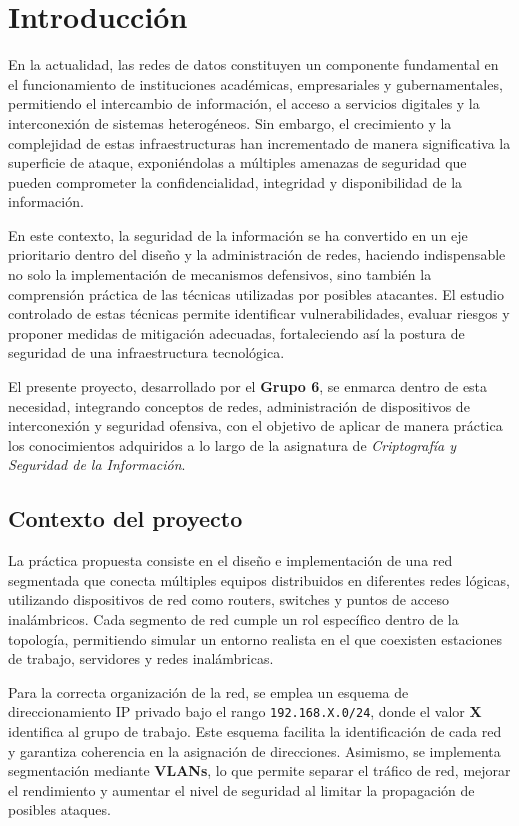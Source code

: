 \section{Introducción}

En la actualidad, las redes de datos constituyen un componente fundamental en el funcionamiento de instituciones académicas, empresariales y gubernamentales, permitiendo el intercambio de información, el acceso a servicios digitales y la interconexión de sistemas heterogéneos. Sin embargo, el crecimiento y la complejidad de estas infraestructuras han incrementado de manera significativa la superficie de ataque, exponiéndolas a múltiples amenazas de seguridad que pueden comprometer la confidencialidad, integridad y disponibilidad de la información.

En este contexto, la seguridad de la información se ha convertido en un eje prioritario dentro del diseño y la administración de redes, haciendo indispensable no solo la implementación de mecanismos defensivos, sino también la comprensión práctica de las técnicas utilizadas por posibles atacantes. El estudio controlado de estas técnicas permite identificar vulnerabilidades, evaluar riesgos y proponer medidas de mitigación adecuadas, fortaleciendo así la postura de seguridad de una infraestructura tecnológica.

El presente proyecto, desarrollado por el \textbf{Grupo 6}, se enmarca dentro de esta necesidad, integrando conceptos de redes, administración de dispositivos de interconexión y seguridad ofensiva, con el objetivo de aplicar de manera práctica los conocimientos adquiridos a lo largo de la asignatura de \textit{Criptografía y Seguridad de la Información}.

\subsection{Contexto del proyecto}

La práctica propuesta consiste en el diseño e implementación de una red segmentada que conecta múltiples equipos distribuidos en diferentes redes lógicas, utilizando dispositivos de red como routers, switches y puntos de acceso inalámbricos. Cada segmento de red cumple un rol específico dentro de la topología, permitiendo simular un entorno realista en el que coexisten estaciones de trabajo, servidores y redes inalámbricas.

Para la correcta organización de la red, se emplea un esquema de direccionamiento IP privado bajo el rango \texttt{192.168.X.0/24}, donde el valor \textbf{X} identifica al grupo de trabajo. Este esquema facilita la identificación de cada red y garantiza coherencia en la asignación de direcciones. Asimismo, se implementa segmentación mediante \textbf{VLANs}, lo que permite separar el tráfico de red, mejorar el rendimiento y aumentar el nivel de seguridad al limitar la propagación de posibles ataques.

